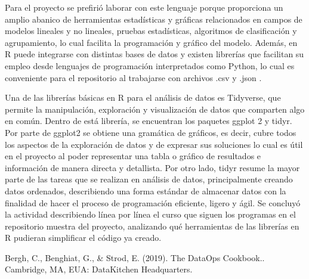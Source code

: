 \documentclass{article}
\begin{document}
    Para el proyecto se prefirió laborar con este lenguaje porque proporciona un amplio abanico de herramientas estadísticas y gráficas relacionados en campos de modelos lineales y no lineales, pruebas estadísticas, algoritmos de clasificación y agrupamiento, lo cual facilita la programación y gráfico del modelo. Además, en R puede integrarse con distintas bases de datos y existen librerías que facilitan su empleo desde lenguajes de programación interpretados como Python, lo cual es conveniente para el repositorio al trabajarse con archivos .csv y .json .

    Una de las librerías básicas en R para el análisis de datos es Tidyverse, que permite la manipulación, exploración y visualización de datos que comparten algo en común. Dentro de está librería, se encuentran los paquetes ggplot 2 y tidyr. Por parte de ggplot2 se obtiene una gramática de gráficos, es decir, cubre todos los aspectos de la exploración de datos y de expresar sus soluciones lo cual es útil en el proyecto al poder representar una tabla o gráfico de resultados e información de manera directa y detallista. Por otro lado, tidyr resume la mayor parte de las tareas que se realizan en análisis de datos, principalmente creando datos ordenados, describiendo una forma estándar de almacenar datos con la finalidad de hacer el proceso de programación eficiente, ligero y ágil.
    Se concluyó la actividad describiendo línea por línea el curso que siguen los programas en el repositorio muestra del proyecto, analizando qué herramientas de las librerías en R pudieran simplificar el código ya creado.

\begin{thebibliography}{1} 
 Bergh, C., Benghiat, G., \& Strod, E. (2019). The DataOps Cookbook.. Cambridge, MA, EUA: DataKitchen Headquarters.
\end{thebibliography}
\end{document}
